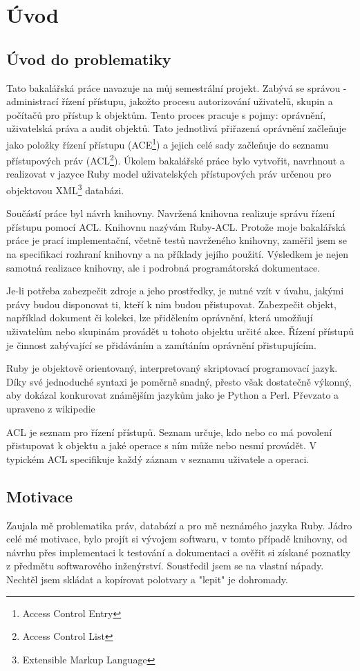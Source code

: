 \chapter{Úvod}

\section{Úvod do problematiky}

Tato bakalářská práce navazuje na můj semestrální projekt. Zabývá se správou - administrací řízení přístupu, jakožto procesu autorizování uživatelů, skupin a počítačů pro přístup k objektům. Tento proces pracuje s pojmy: oprávnění, uživatelská práva a audit objektů. Tato jednotlivá přiřazená oprávnění začleňuje jako položky řízení přístupu (ACE\footnote{Access Control Entry}) a jejich celé sady začleňuje do seznamu přístupových práv (ACL\footnote{Access Control List}). Úkolem bakalářské práce bylo vytvořit, navrhnout a realizovat v jazyce Ruby model uživatelských přístupových práv určenou pro objektovou XML\footnote{Extensible Markup Language} databázi.

Součástí práce byl návrh knihovny. Navržená knihovna realizuje správu řízení přístupu pomocí ACL. Knihovnu nazývám Ruby-ACL. Protože moje bakalářská práce je prací implementační, včetně testů navrženého knihovny, zaměřil jsem se na specifikaci rozhraní knihovny a na příklady jejího použití. Výsledkem je nejen samotná realizace knihovny, ale i podrobná programátorská dokumentace.

Je-li potřeba zabezpečit zdroje a jeho prostředky, je nutné vzít v úvahu, jakými právy budou disponovat ti, kteří k nim budou přistupovat. Zabezpečit objekt, například dokument či kolekci, lze přidělením oprávnění, která umožňují uživatelům nebo skupinám provádět u tohoto objektu určité akce. Řízení přístupů je činnost zabývající se přidáváním a zamítáním oprávnění přistupujícím.

Ruby je objektově orientovaný, interpretovaný skriptovací programovací jazyk. Díky své jednoduché syntaxi je poměrně snadný, přesto však dostatečně výkonný, aby dokázal konkurovat známějším jazykům jako je Python a Perl. Převzato a upraveno z wikipedie\cite{wiki:Ruby}

ACL je seznam pro řízení přístupů. Seznam určuje, kdo nebo co má povolení přistupovat k objektu a jaké operace s ním může nebo nesmí provádět. V typickém ACL specifikuje každý záznam v seznamu uživatele a operaci\cite{wiki:acl}.


\section{Motivace}
Zaujala mě problematika práv, databází a pro mě neznámého jazyka Ruby.
Jádro celé mé motivace, bylo projít si vývojem softwaru, v tomto případě knihovny, od návrhu přes implementaci k testování a dokumentaci a ověřit si získané poznatky z předmětu softwarového inženýrství. Soustředil jsem se na vlastní nápady. Nechtěl jsem skládat a kopírovat polotvary a "lepit" je dohromady.